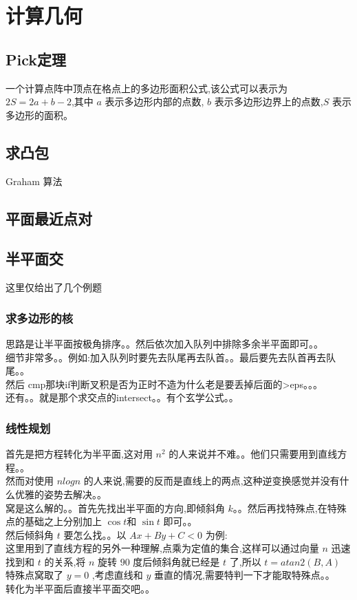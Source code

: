 %
%
	\newpage
	\section{计算几何}
	\subsection{Pick定理}
	一个计算点阵中顶点在格点上的多边形面积公式,该公式可以表示为 $2S=2a+b-2$,其中 $a$ 表示多边形内部的点数, $b$ 表示多边形边界上的点数,$S$ 表示多边形的面积。\\
	\subsection{求凸包}
	Graham 算法\\
	
	\newpage
	\subsection{平面最近点对}
	
	\newpage
	\subsection{半平面交}
	这里仅给出了几个例题
	\subsubsection{求多边形的核}
	思路是让半平面按极角排序。。然后依次加入队列中排除多余半平面即可。。  \\
	细节非常多。。例如:加入队列时要先去队尾再去队首。。最后要先去队首再去队尾。。\\
	然后 cmp那块if判断叉积是否为正时不造为什么老是要丢掉后面的>eps。。。\\
	还有。。就是那个求交点的intersect。。有个玄学公式。。\\
	
	\subsubsection{线性规划}
	首先是把方程转化为半平面,这对用 $n^2$ 的人来说并不难。。他们只需要用到直线方程。。\\
	然而对使用 $nlogn$ 的人来说,需要的反而是直线上的两点,这种逆变换感觉并没有什么优雅的姿势去解决。。\\
	窝是这么解的。。首先先找出半平面的方向,即倾斜角 $k$。。然后再找特殊点,在特殊点的基础之上分别加上 $\cos t$和 $\sin t$ 即可。。\\
	然后倾斜角 $t$ 要怎么找。。以 $Ax+By+C<0$ 为例:\\
	这里用到了直线方程的另外一种理解,点乘为定值的集合,这样可以通过向量 $n$ 迅速找到和 $t$ 的关系,将 $n$ 旋转 $90$ 度后倾斜角就已经是 $t$ 了,所以 $t=atan2(B,A)$\\
	特殊点窝取了 $y=0$ ,考虑直线和 $y$ 垂直的情况,需要特判一下才能取特殊点。。\\
	转化为半平面后直接半平面交吧。。\\
	
	\newpage
